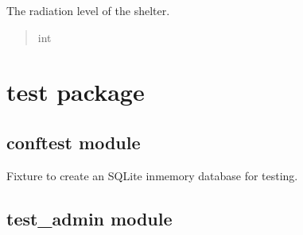 \documentclass[letterpaper,10pt,english]{sphinxmanual}
\begin{document}
\begin{fulllineitems}
\begin{fulllineitems}
\label{\detokenize{app.mysql:app.mysql.shelter.Shelter.radiationLevel}}
\pysigstartsignatures
\pysigline
{}
\pysigstopsignatures
\sphinxAtStartPar
The radiation level of the shelter.
\begin{quote}\begin{description}
\sphinxAtStartPar
int

\end{description}\end{quote}

\end{fulllineitems}


\end{fulllineitems}


\sphinxstepscope


\chapter{test package}
\label{\detokenize{test:test-package}}\label{\detokenize{test::doc}}

\section{conftest module}
\label{\detokenize{test:module-test.conftest}}\label{\detokenize{test:conftest-module}}

\begin{fulllineitems}
\label{\detokenize{test:test.conftest.setup_database}}
\pysigstartsignatures
\pysiglinewithargsret
{}
{}
{}
\pysigstopsignatures
\sphinxAtStartPar
Fixture to create an SQLite in\sphinxhyphen{}memory database for testing.

\end{fulllineitems}



\section{test\_admin module}
\label{\detokenize{test:module-test.test_admin}}\label{\detokenize{test:test-admin-module}}
\end{document}
